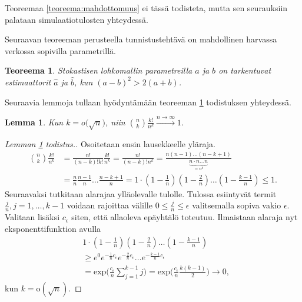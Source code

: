 \documentclass[finnish,12pt,a4paper,pdftex,sci,utf8]{aaltothesis}
\newtheorem{lemma}{Lemma}
\newtheorem{teoreema}{Teoreema}
\begin{document}
Teoreemaa \ref{teoreema:mahdottomuus} ei tässä todisteta, mutta sen seurauksiin palataan simulaatiotulosten yhteydessä.

Seuraavan teoreeman perusteella tunnistustehtävä on mahdollinen harvassa verkossa sopivilla parametrillä.
\begin{teoreema}
	\label{teoreema:tarkentuvatest}
	Stokastisen lohkomallin parametreilla $a$ ja $b$ on tarkentuvat estimaattorit $\hat{a}$ ja $\hat{b}$, kun $(a-b)^{2} > 2(a+b)$.
\end{teoreema}

Seuraavia lemmoja tullaan hyödyntämään teoreeman \ref{teoreema:tarkentuvatest} todistuksen yhteydessä.
\begin{lemma}
	\label{lemma:kombinaatiokertoma_nk}
	Kun $k = o\big(\sqrt{n}\big)$, niin $\binom{n}{k}\frac{k!}{n^{k}} \xrightarrow{n \to \infty} 1$.
\end{lemma}
\begin{proof}[Lemman \ref{lemma:kombinaatiokertoma_nk} todistus.]
	Osoitetaan ensin lausekkeelle yläraja.
	\begin{align*}
		\binom{n}{k}\frac{k!}{n^{k}} &= \frac{n!}{(n-k)!k!} \frac{k!}{n^k} = \frac{n!}{(n-k)!n^k} = \frac{n (n-1) \ldots (n-k+1)}{\underbrace{n \cdot n \ldots n}_{=n^k}}  \\ &= \frac{n}{n} \frac{n-1}{n} \ldots \frac{n-k+1}{n} = 1 \cdot (1 -\frac{1}{n}) (1-\frac{2}{n}) \ldots (1 - \frac{k-1}{n}) \leq 1.
	\end{align*}
	Seuraavaksi tutkitaan alarajaa ylläolevalle tulolle. Tulossa esiintyvät termit $\frac{j}{n}, j = 1, \ldots ,k-1$ voidaan rajoittaa välille $0 \leq \frac{j}{n} \leq \epsilon$ valitsemalla sopiva vakio $\epsilon$. Valitaan lisäksi $c{_\epsilon}$ siten, että allaoleva epäyhtälö toteutuu. Ilmaistaan alaraja nyt eksponenttifunktion avulla 
	\begin{align*}
		&1 \cdot (1 -\frac{1}{n}) (1-\frac{2}{n}) \ldots (1 - \frac{k-1}{n}) \\
		&\geq e^0 e^{-\frac{1}{n}c{_\epsilon}} e^{-\frac{2}{n}c{_\epsilon}} \ldots e^{-\frac{k-1}{n}c{_\epsilon}} \\
		&= \text{exp}\big(\frac{c{_\epsilon}}{n} \sum_{j=1}^{k-1} j \big) = \text{exp}\big(\frac{c{_\epsilon}}{n} \frac{k(k-1)}{2} \big)  \rightarrow 0,
	\end{align*}
	kun $k = \text{o}(\sqrt{n})$.
\end{proof}

\end{document}
